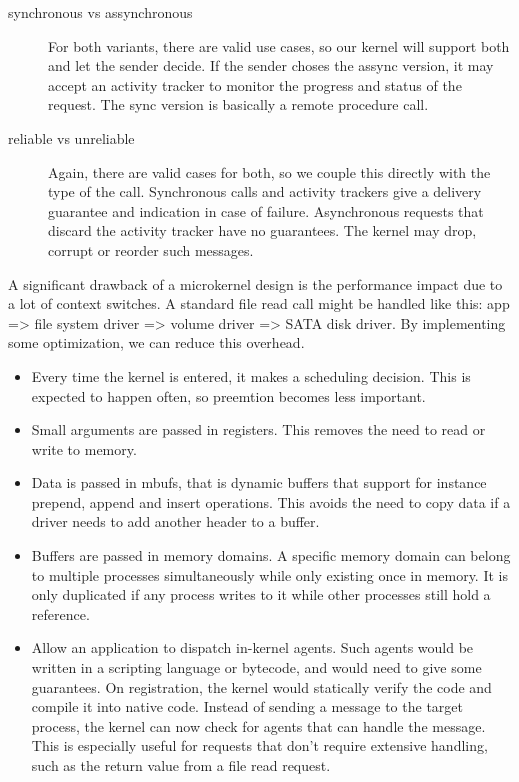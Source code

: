 \documentclass[a4paper]{article}
\begin{document}
\begin{description}
  \item[synchronous vs assynchronous] For both variants, there are valid use cases, so our kernel will support both and let the sender decide. If the sender choses the assync version, it may accept an activity tracker to monitor the progress and status of the request. The sync version is basically a remote procedure call.
  \item[reliable vs unreliable] Again, there are valid cases for both, so we couple this directly with the type of the call. Synchronous calls and activity trackers give a delivery guarantee and indication in case of failure. Asynchronous requests that discard the activity tracker have no guarantees. The kernel may drop, corrupt or reorder such messages.
\end{description}

A significant drawback of a microkernel design is the performance impact due to a lot of context switches. A standard file read call might be handled like this: app => file system driver => volume driver => SATA disk driver. By implementing some optimization, we can reduce this overhead.
\begin{itemize}
  \item Every time the kernel is entered, it makes a scheduling decision. This is expected to happen often, so preemtion becomes less important.
  \item Small arguments are passed in registers. This removes the need to read or write to memory.
  \item Data is passed in mbufs, that is dynamic buffers that support for instance prepend, append and insert operations. This avoids the need to copy data if a driver needs to add another header to a buffer.
  \item Buffers are passed in memory domains. A specific memory domain can belong to multiple processes simultaneously while only existing once in memory. It is only duplicated if any process writes to it while other processes still hold a reference.
  \item Allow an application to dispatch in-kernel agents. Such agents would be written in a scripting language or bytecode, and would need to give some guarantees. On registration, the kernel would statically verify the code and compile it into native code. Instead of sending a message to the target process, the kernel can now check for agents that can handle the message. This is especially useful for requests that don't require extensive handling, such as the return value from a file read request.
\end{itemize}
\end{document}
